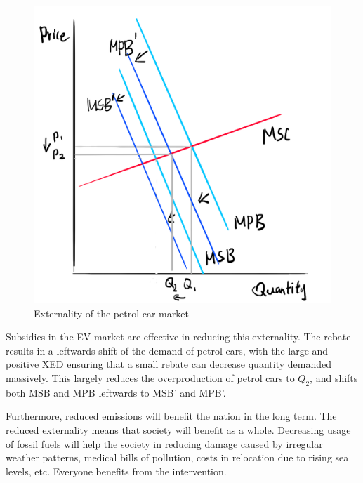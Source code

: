 \documentclass[a4paper,12pt]{article}
\begin{document}
\begin{figure}[H]
    \centering
    \includegraphics[scale=0.5]{extern_petrol.png}
    \caption{Externality of the petrol car market}
    \label{fig:extern}
\end{figure}

Subsidies in the EV market are effective in reducing this externality. The rebate results in a leftwards shift of the demand of petrol cars, with the large and positive XED ensuring that a small rebate can decrease quantity demanded massively. This largely reduces the overproduction of petrol cars to $Q_2$, and shifts both MSB and MPB leftwards to MSB' and MPB'.


Furthermore, reduced emissions will benefit the nation in the long term.
The reduced externality means that society will benefit as a whole. Decreasing usage of fossil fuels will help the society in reducing damage caused by irregular weather patterns, medical bills of pollution, costs in relocation due to rising sea levels, etc. Everyone benefits from the intervention.
\end{document}
